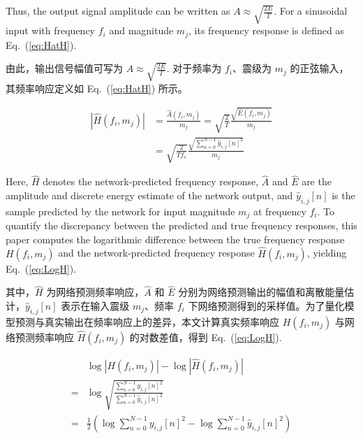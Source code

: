 \documentclass[sn-nature]{sn-jnl}
\newif\ifCNENEnglish
\newif\ifCNENBilingual
\newcommand{\CNEN}[2]{%
    \ifCNENBilingual
        #1%
        \if\relax\detokenize{#2}\relax\else\par #2\fi%
    \else
        \ifCNENEnglish
            #2%
        \else
            #1%
        \fi
    \fi
}
\newcommand{\magn}{m} %
\newcommand{\fidx}{i} %
\newcommand{\midx}{j} %
\newcommand{\pidx}{n} %
\newcommand{\pmax}{N} %
\newcommand{\pred}[1]{\hat{#1}} %
\begin{document}
\CNEN{由此，输出信号幅值可写为 $A \approx \sqrt{\frac{2E}{T}}$. 对于频率为 $f_\fidx$、震级为 $\magn_\midx$ 的正弦输入，其频率响应定义如 Eq.~(\ref{eq:HatH}) 所示。}{Thus, the output signal amplitude can be written as $A \approx \sqrt{\frac{2E}{T}}$. For a sinusoidal input with frequency $f_\fidx$ and magnitude $\magn_\midx$, its frequency response is defined as Eq.~(\ref{eq:HatH}).%
}
\begin{equation}
    \begin{aligned}
        \left|\pred{H}(f_\fidx,\magn_\midx)\right|
         & = \frac{\pred{A}(f_\fidx,\magn_\midx)}{\magn_\midx}
        = \sqrt{\frac{2}{T}} \frac{\sqrt{\hat{E}(f_\fidx,\magn_\midx)}}{\magn_\midx} \\
        & = \sqrt{\frac{2}{T f_s}} \frac{\sqrt{\sum_{\pidx=0}^{\pmax-1} \hat{y}_{\fidx,\midx}[n]^2}}{\magn_\midx}
    \end{aligned}
    \label{eq:HatH}
\end{equation}

\CNEN{其中，$\pred{H}$ 为网络预测频率响应，$\pred{A}$ 和 $\hat{E}$ 分别为网络预测输出的幅值和离散能量估计，$\hat{y}_{\fidx,\midx}[n]$ 表示在输入震级 $\magn_\midx$、频率 $f_\fidx$ 下网络预测得到的采样值。为了量化模型预测与真实输出在频率响应上的差异，本文计算真实频率响应 $H(f_\fidx,\magn_\midx)$ 与网络预测频率响应 $\pred{H}(f_\fidx,\magn_\midx)$ 的对数差值，得到 Eq.~(\ref{eq:LogH}).}{Here, $\pred{H}$ denotes the network-predicted frequency response, $\pred{A}$ and $\hat{E}$ are the amplitude and discrete energy estimate of the network output, and $\hat{y}_{\fidx,\midx}[n]$ is the sample predicted by the network for input magnitude $\magn_\midx$ at frequency $f_\fidx$. To quantify the discrepancy between the predicted and true frequency responses, this paper computes the logarithmic difference between the true frequency response $H(f_\fidx,\magn_\midx)$ and the network-predicted frequency response $\pred{H}(f_\fidx,\magn_\midx)$, yielding Eq.~(\ref{eq:LogH}).%
}\begin{equation}
    \begin{aligned}
                    & \log\left|H(f_\fidx,\magn_\midx)\right| - \log\left|\pred{H}(f_\fidx, \magn_\midx)\right| \\
            = & \log \sqrt{\frac{\sum_{\pidx=0}^{\pmax-1}y_{\fidx,\midx}[n]^2}{\sum_{\pidx=0}^{\pmax-1}\hat{y}_{\fidx,\midx}[n]^2}} \\
            = & \frac{1}{2} \left( \log \sum_{\pidx=0}^{\pmax-1}y_{\fidx,\midx}[n]^2 - \log \sum_{\pidx=0}^{\pmax-1}\hat{y}_{\fidx,\midx}[n]^2 \right)
        \end{aligned}
        \label{eq:LogH}
\end{equation}
\end{document}
